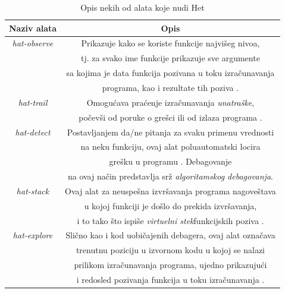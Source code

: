 \documentclass[a4paper]{article}
\begin{document}
{{%
\begin{table}[h!]
\begin{center}
\caption{Opis nekih od alata koje nudi Het}
\begin{tabular}{|c|c|} \hline
Naziv alata & Opis\\ \hline
{\em hat-observe} & { Prikazuje kako se koriste funkcije najvišeg nivoa, } \\ & 
		    { tj. za svako ime funkcije prikazuje sve argumente } \\ & 
		    { sa kojima je data funkcija pozivana u toku izračunavanja }\\ & 
		    { programa, kao i rezultate tih poziva \cite{hat_haskell_org}.}\\ \hline
{\em hat-trail} & { Omogućava praćenje izračunavanja {\em unatraške}, } \\ & 
		  { počevši od poruke o grešci ili od izlaza programa \cite{hat_haskell_org}.}\\ \hline
{\em hat-detect} & { Postavljanjem da/ne pitanja za svaku primenu vrednosti  } \\ &
		   { na neku funkciju, ovaj alat poluautomatski locira } \\ &
		   { grešku u programu \cite{hat_haskell_org}. Debagovanje } \\ &
		   { na ovaj način predstavlja srž {\em algoritamskog debagovanja}. }\\ \hline
{\em hat-stack} & { Ovaj alat za neuspešna izvršavanja programa nagoveštava } \\ & 
		  { u kojoj funkciji je došlo do prekida izvršavanja, } \\ & 
		  { i to tako što ispiše {\em virtuelni stek}\footnotemark[1] funkcijskih poziva \cite{hat_haskell_org}. }\\ \hline %
{\em hat-explore} & { Slično kao i kod uobičajenih debagera, ovaj alat označava }\\ &
		    { trenutnu poziciju u izvornom kodu u kojoj se nalazi } \\ &
		    { prilikom izračunavanja programa, ujedno prikazujući } \\ &
		    { i redosled pozivanja funkcija u toku izračunavanja \cite{hat_haskell_org}.} \\ \hline
\end{tabular}
\label{tab:tabela_hat}
\end{center}
\end{table}

}}
\end{document}
